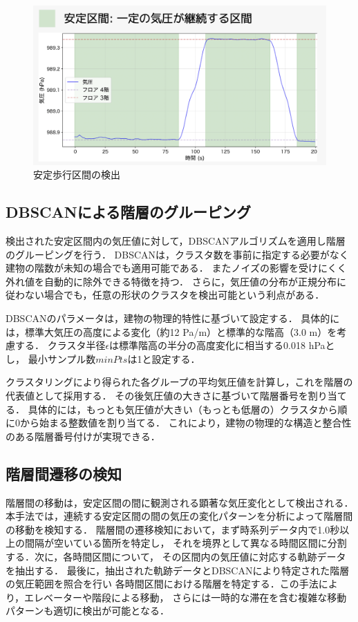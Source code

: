 \begin{figure}[h]
	\centering
	\includegraphics[width=\linewidth]{../image/stable.jpg}
	\caption{安定歩行区間の検出}    \label{fig:stable_section}
\end{figure}

\subsection{DBSCANによる階層のグルーピング}
検出された安定区間内の気圧値に対して，DBSCANアルゴリズムを適用し階層のグルーピングを行う．
DBSCANは，クラスタ数を事前に指定する必要がなく建物の階数が未知の場合でも適用可能である．
またノイズの影響を受けにくく外れ値を自動的に除外できる特徴を持つ．
さらに，気圧値の分布が正規分布に従わない場合でも，任意の形状のクラスタを検出可能という利点がある．

DBSCANのパラメータは，建物の物理的特性に基づいて設定する．
具体的には，標準大気圧の高度による変化（約12 Pa/m）と標準的な階高（3.0 m）を考慮する．
クラスタ半径$\epsilon$は標準階高の半分の高度変化に相当する0.018 hPaとし，
最小サンプル数$minPts$は1と設定する．

クラスタリングにより得られた各グループの平均気圧値を計算し，これを階層の代表値として採用する．
その後気圧値の大きさに基づいて階層番号を割り当てる．
具体的には，もっとも気圧値が大きい（もっとも低層の）クラスタから順に0から始まる整数値を割り当てる．
これにより，建物の物理的な構造と整合性のある階層番号付けが実現できる．

\subsection{階層間遷移の検知}
階層間の移動は，安定区間の間に観測される顕著な気圧変化として検出される．
本手法では，連続する安定区間の間の気圧の変化パターンを分析によって階層間の移動を検知する．
階層間の遷移検知において，まず時系列データ内で1.0秒以上の間隔が空いている箇所を特定し，
それを境界として異なる時間区間に分割する．次に，各時間区間について，
その区間内の気圧値に対応する軌跡データを抽出する．
最後に，抽出された軌跡データとDBSCANにより特定された階層の気圧範囲を照合を行い
各時間区間における階層を特定する．この手法により，エレベーターや階段による移動，
さらには一時的な滞在を含む複雑な移動パターンも適切に検出が可能となる．

